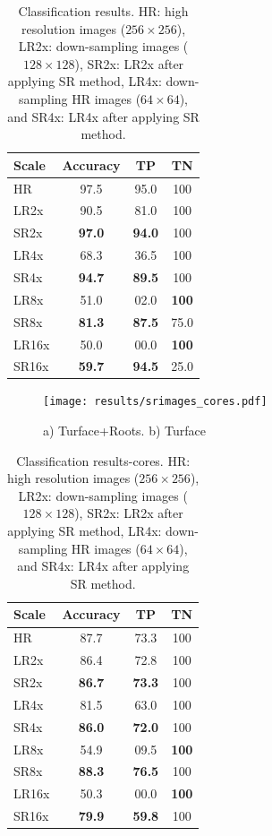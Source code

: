 \documentclass[10pt,twocolumn,letterpaper]{article}
\begin{document}
\begin{table}[h]
\caption{Classification results. HR: high resolution images ($256\times 256$), LR2x: down-sampling images ($128\times 128$), SR2x: LR2x after applying SR method, LR4x: down-sampling HR images ($64\times 64$), and SR4x: LR4x after applying SR method.}
\label{tab:results}
\centering
\begin{tabular}{|l|c|c|c|}
\hline
  Scale   & Accuracy & TP & TN \\
\hline
\hline
HR & 97.5 & 95.0 & 100 \\
\hline
LR2x & 90.5 & 81.0 & 100 \\
SR2x & \textbf{97.0} & \textbf{94.0} & 100 \\
\hline
LR4x & 68.3 & 36.5 & 100 \\
SR4x & \textbf{94.7} & \textbf{89.5} & 100 \\
\hline
LR8x & 51.0 & 02.0 & \textbf{100} \\
SR8x & \textbf{81.3} & \textbf{87.5} & 75.0 \\
\hline
LR16x & 50.0 & 00.0 & \textbf{100} \\
SR16x & \textbf{59.7} & \textbf{94.5} & 25.0 \\
\hline
\end{tabular}
\end{table}

\begin{figure}[h]
\begin{center}
\texttt{[image: results/srimages\_cores.pdf]}
\end{center}
   \caption{a) Turface+Roots. b) Turface}
\label{fig:srimages_cores}
\end{figure}

\begin{table}[h]
\caption{Classification results-cores. HR: high resolution images ($256\times 256$), LR2x: down-sampling images ($128\times 128$), SR2x: LR2x after applying SR method, LR4x: down-sampling HR images ($64\times 64$), and SR4x: LR4x after applying SR method.}
\label{tab:results_cores}
\centering
\begin{tabular}{|l|c|c|c|}
\hline
  Scale   & Accuracy & TP & TN \\
\hline
\hline
HR & 87.7 & 73.3 & 100 \\
\hline
LR2x & 86.4 & 72.8 & 100 \\
SR2x & \textbf{86.7} & \textbf{73.3} & 100 \\
\hline
LR4x & 81.5 & 63.0 & 100 \\
SR4x & \textbf{86.0} & \textbf{72.0} & 100 \\
\hline
LR8x & 54.9 & 09.5 & \textbf{100} \\
SR8x & \textbf{88.3} & \textbf{76.5} & 100 \\
\hline
LR16x & 50.3 & 00.0 & \textbf{100} \\
SR16x & \textbf{79.9} & \textbf{59.8} & 100 \\
\hline
\end{tabular}
\end{table}
\end{document}
